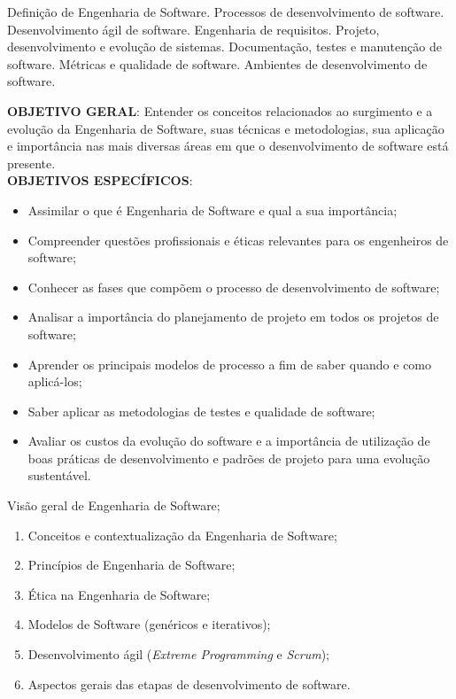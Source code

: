 
\begin{pud}
	
	\ementa
	Definição de Engenharia de Software. Processos de desenvolvimento de software. Desenvolvimento ágil de software. Engenharia de requisitos. Projeto, desenvolvimento e evolução de sistemas. Documentação, testes e manutenção de software. Métricas e qualidade de software. Ambientes de desenvolvimento de software.
	
	\objetivos
	\textbf{OBJETIVO GERAL}:
	Entender os conceitos relacionados ao surgimento e a evolução da Engenharia de Software, suas técnicas e metodologias, sua aplicação e importância nas mais diversas áreas em que o desenvolvimento de software está presente.	
	\newline\\	
	\textbf{OBJETIVOS ESPECÍFICOS}:
	\begin{itemize}
		\item Assimilar o que é Engenharia de Software e qual a sua importância;
		\item Compreender questões profissionais e éticas relevantes para os engenheiros de software; 
		\item Conhecer as fases que compõem o processo de desenvolvimento de software;
		\item Analisar a importância do planejamento de projeto em todos os projetos de software;
		\item Aprender os principais modelos de processo a fim de saber quando e como aplicá-los; 
		\item Saber aplicar as metodologias de testes e qualidade de software;
		\item Avaliar os custos da evolução do software e a importância de utilização de boas práticas de desenvolvimento e padrões de projeto para uma evolução sustentável.
	\end{itemize}
	
	\programa
	\begin{description}[itemsep=0em]
		\item[UNIDADE I:] Visão geral de Engenharia de Software; 
	         \begin{enumerate}[itemsep=0em, topsep=0em]
                \item Conceitos e contextualização da Engenharia de Software;
				\item Princípios de Engenharia de Software;
                \item Ética na Engenharia de Software;
				\item Modelos de Software (genéricos e iterativos);
				\item Desenvolvimento ágil (\textit{Extreme Programming} e \textit{Scrum});
				\item Aspectos gerais das etapas de desenvolvimento de software.
            \end{enumerate}
            

\end{description}
\end{pud}
